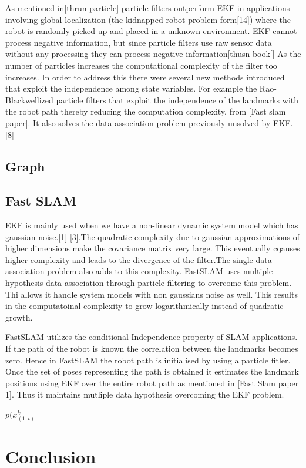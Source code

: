 \documentclass[conference]{IEEEtran}
\begin{document}
As mentioned in[thrun particle] particle filters outperform EKF in applications involving global localization (the kidnapped robot problem form[14]) where the robot is randomly picked up and placed in a unknown environment. 
EKF cannot process negative information, but since particle filters use raw sensor data without any processing they can process negative information[thusn book[]
As the number of particles increases the computational complexity of the filter too increases. In order to address this there were several new methods introduced that  exploit the independence among state variables. For example the Rao-Blackwellized particle filters that exploit the independence of the landmarks with the robot path thereby reducing the computation complexity. from [Fast slam paper]. It also solves the data association problem previously unsolved by EKF.[8]
	
	
	
	\subsection{Graph}
	
	\subsection{Fast SLAM}
	EKF is mainly used when we have a non-linear dynamic system model which has gaussian noise.[1]-[3].The quadratic complexity due to gaussian approximations of higher dimensions make the covariance matrix very large. This eventually cqauses higher complexity and leads to the divergence of the filter.The single data association problem also adds to this complexity. FastSLAM uses multiple hypothesis data association through particle filtering to overcome this problem. Thi allows it handle system models with non gaussians noise as well. This results in the computatoinal complexity to grow logarithmically instead of quadratic growth.
	
	FastSLAM utilizes the conditional Independence property of SLAM applications. If the path of the robot is known the correlation between the landmarks becomes zero. Hence in FastSLAM the robot path is initialised by using a particle fitler. Once the set of poses representing the path is obtained it estimates the landmark positions using EKF over the entire robot path as mentioned in [Fast Slam paper 1]. Thus it maintains mutliple data hypothesis overcoming the EKF problem.
	
	$p(x^{k}_(1:t)$ 
	
	
	
	
	
	
	
	
	
	
	
	
	
	
	
	
	\section{Conclusion}
	
	
	
	
	
	
	
	
	
	
	
\end{document}
